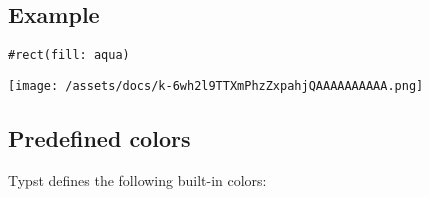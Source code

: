 \subsection{Example}\label{example}

\begin{verbatim}
#rect(fill: aqua)
\end{verbatim}

\texttt{[image: /assets/docs/k-6wh2l9TTXmPhzZxpahjQAAAAAAAAAA.png]}

\subsection{Predefined colors}\label{predefined-colors}

Typst defines the following built-in colors:

